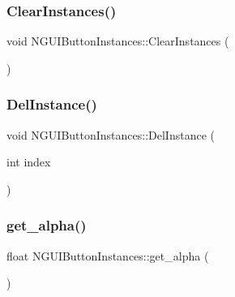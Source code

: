 \hypertarget{class_n_g_u_i_button_instances_adbdc40d73856bcabe40e1b2b0bde8070}{}\label{class_n_g_u_i_button_instances_adbdc40d73856bcabe40e1b2b0bde8070} 
\subsubsection{\texorpdfstring{Clear\+Instances()}{ClearInstances()}}
{\footnotesize\ttfamily void N\+G\+U\+I\+Button\+Instances\+::\+Clear\+Instances (\begin{DoxyParamCaption}{ }\end{DoxyParamCaption})}

\hypertarget{class_n_g_u_i_button_instances_a8984fb9bd5727addc84361a33f16cb2c}{}\label{class_n_g_u_i_button_instances_a8984fb9bd5727addc84361a33f16cb2c} 
\subsubsection{\texorpdfstring{Del\+Instance()}{DelInstance()}}
{\footnotesize\ttfamily void N\+G\+U\+I\+Button\+Instances\+::\+Del\+Instance (\begin{DoxyParamCaption}\item[{int}]{index }\end{DoxyParamCaption})}

\hypertarget{class_n_g_u_i_button_instances_a1ce9bcc5c5ae13a64648780777985ce0}{}\label{class_n_g_u_i_button_instances_a1ce9bcc5c5ae13a64648780777985ce0} 
\subsubsection{\texorpdfstring{get\+\_\+alpha()}{get\_alpha()}}
{\footnotesize\ttfamily float N\+G\+U\+I\+Button\+Instances\+::get\+\_\+alpha (\begin{DoxyParamCaption}{ }\end{DoxyParamCaption})}

\hypertarget{class_n_g_u_i_button_instances_a27a0daac5dc2f4146bd7a2754ee0bb7f}{}\label{class_n_g_u_i_button_instances_a27a0daac5dc2f4146bd7a2754ee0bb7f} 
